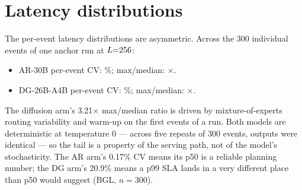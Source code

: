 \section{Latency distributions}
\label{app:distributions} The per-event latency distributions are asymmetric. Across the 300 individual
events of one anchor run at $L{=}256$:
\begin{itemize}[nosep]
\item AR-30B per-event CV: \arEventCV\%; max/median: \arMaxMed$\times$.
\item DG-26B-A4B per-event CV: \dgEventCV\%; max/median: \dgMaxMed$\times$.
\end{itemize}
The diffusion arm's 3.21$\times$ max/median ratio is driven by
mixture-of-experts routing variability and warm-up on the first events of a
run. Both models are deterministic at temperature 0 --- across five repeats of
300 events, outputs were identical --- so the tail is a property of the
serving path, not of the model's stochasticity. The AR arm's 0.17\% CV means
its p50 is a reliable planning number; the DG arm's 20.9\% means a p99 SLA
lands in a very different place than p50 would suggest
(BGL, $n{=}300$).
